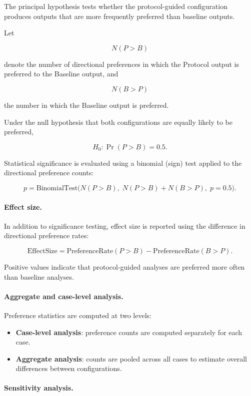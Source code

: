The principal hypothesis tests whether the protocol-guided configuration
produces outputs that are more frequently preferred than baseline outputs.

Let

\[
N(P>B)
\]

denote the number of directional preferences in which the Protocol output is
preferred to the Baseline output, and

\[
N(B>P)
\]

the number in which the Baseline output is preferred.

Under the null hypothesis that both configurations are equally likely to be
preferred,

\[
H_0: \Pr(P>B) = 0.5.
\]

Statistical significance is evaluated using a binomial (sign) test applied to
the directional preference counts:

\[
p = \text{BinomialTest}\big(N(P>B),\; N(P>B)+N(B>P),\; p=0.5\big).
\]

\paragraph{Effect size.}

In addition to significance testing, effect size is reported using the
difference in directional preference rates:

\[
\text{EffectSize} =
\text{PreferenceRate}(P>B) -
\text{PreferenceRate}(B>P).
\]

Positive values indicate that protocol-guided analyses are preferred more
often than baseline analyses.

\paragraph{Aggregate and case-level analysis.}

Preference statistics are computed at two levels:

\begin{itemize}
\item \textbf{Case-level analysis}: preference counts are computed separately
for each case.
\item \textbf{Aggregate analysis}: counts are pooled across all cases to
estimate overall differences between configurations.
\end{itemize}

\paragraph{Sensitivity analysis.}

